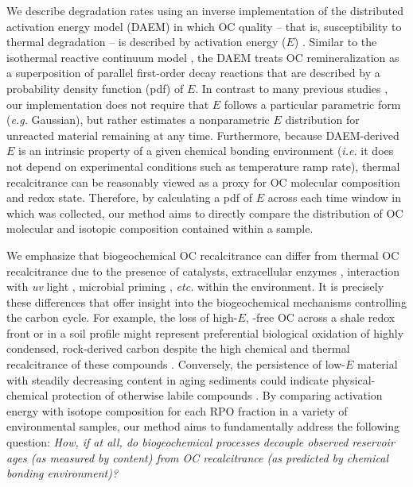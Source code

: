 We describe degradation rates using an inverse implementation of the distributed activation energy model (DAEM) in which OC quality -- that is, susceptibility to thermal degradation -- is described by activation energy ($E$) \citep{Braun:1987vf,Burnham:1987ut,Cramer:2004tg}. Similar to the isothermal reactive continuum model \citep{Boudreau:1991wf,Forney:2012dr,Forney:2012hz}, the DAEM treats OC remineralization as a superposition of parallel first-order decay reactions that are described by a probability density function (pdf) of $E$. In contrast to many previous studies \citep[\textit{e.g.}][]{Lakshmanan:1994vs,Cai:2007hh,deCaprariis:2012jk}, our implementation does not require that $E$ follows a particular parametric form (\textit{e.g.} Gaussian), but rather estimates a nonparametric $E$ distribution for unreacted material remaining at any time. Furthermore, because DAEM-derived $E$ is an intrinsic property of a given chemical bonding environment (\textit{i.e.} it does not depend on experimental conditions such as temperature ramp rate), thermal recalcitrance can be reasonably viewed as a proxy for OC molecular composition and redox state. Therefore, by calculating a pdf of $E$ across each time window in which  was collected, our method aims to directly compare the distribution of OC molecular and isotopic composition contained within a sample.

We emphasize that biogeochemical OC recalcitrance can differ from thermal OC recalcitrance due to the presence of catalysts, extracellular enzymes \citep{Sinsabaugh:2008il,Arnosti:2011iv}, interaction with \textit{uv} light \citep{Spencer:2009vl}, microbial priming \citep{Bianchi:2011cu}, \textit{etc.} within the environment. It is precisely these differences that offer insight into the biogeochemical mechanisms controlling the carbon cycle. For example, the loss of high-$E$, -free OC across a shale redox front or in a soil profile might represent preferential biological oxidation of highly condensed, rock-derived carbon despite the high chemical and thermal recalcitrance of these compounds \citep{Petsch:2001eq,Rethemeyer:2004cy,Marschner:2008eo}. Conversely, the persistence of low-$E$ material with steadily decreasing  content in aging sediments could indicate physical-chemical protection of otherwise labile compounds \citep{Mayer:1994wn,Rothman:2007jq}. By comparing activation energy with isotope composition for each RPO fraction in a variety of environmental samples, our method aims to fundamentally address the following question: \textit{How, if at all, do biogeochemical processes decouple observed reservoir ages (as measured by  content) from OC recalcitrance (as predicted by chemical bonding environment)?}


